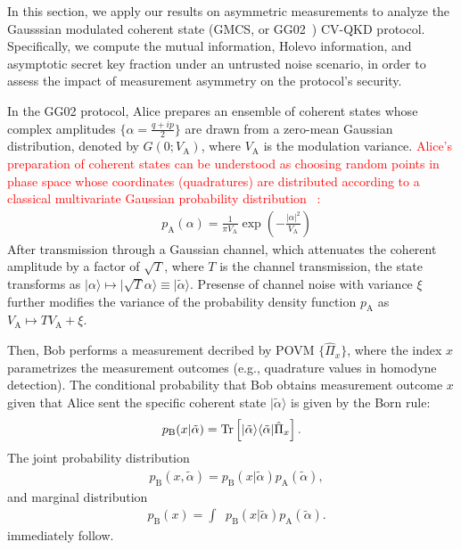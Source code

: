 \documentclass[%
reprint,
superscriptaddress,
 amsmath,amssymb,amsfonts,
 aps,
 pra,
 longbibliography
]{revtex4-2}
\newcommand{\ket}[1]{\ensuremath{|{#1}\rangle}}
\newcommand{\bra}[1]{\ensuremath{\langle{#1}|}}
\newcommand{\Tr}{\mathop{\rm Tr}\nolimits}
\newcommand{\ind}[1]{\mathrm{#1}}
\newcommand{\dd}{\mathrm{d}}
\begin{document}
In this section, we apply our results on asymmetric measurements to analyze the Gausssian modulated coherent state (GMCS, or GG02~\cite{PhysRevLett.88.057902}) CV-QKD protocol. Specifically, we compute the mutual information, Holevo information, and asymptotic secret key fraction under an untrusted noise scenario, in order to assess the impact of measurement asymmetry on the protocol’s security.

In the GG02 protocol, Alice prepares an ensemble of coherent states whose 
complex amplitudes $\{\alpha=\frac{q+ip}2\}$ are drawn from a zero-mean Gaussian distribution, denoted by $G(0; V_{\ind{A}})$, where $V_{\ind{A}}$ is the modulation variance. 
\textcolor{red}{Alice’s preparation of coherent states can be understood as choosing 
random points in phase space whose coordinates (quadratures) are 
distributed according to a classical multivariate Gaussian probability 
distribution {~\cite{Serafini:bk:2017}}:}
\begin{align}
  \label{eq:p_A}
  &p_{\ind{A}}(\alpha)=\frac{1}{\pi V_{\ind{A}}} \exp\left(-\frac{|\alpha|^2}{V_{\ind{A}}}\right)
\end{align}
After transmission through a Gaussian channel, which attenuates the coherent amplitude by a factor of $\sqrt{T}$, where $T$ is the channel transmission, the state transforms as $\ket{\alpha}\mapsto\ket{\sqrt{T}\alpha}\equiv\ket{\tilde\alpha}$. Presense of channel noise with variance $\xi$ further modifies the variance of the probability density function $p_{\ind{A}}$ as $V_{\ind{A}}\mapsto TV_{\ind{A}}+\xi$.

Then, Bob performs a measurement decribed by POVM $\{\hat{\Pi}_x\}$, where the index $x$ parametrizes the measurement outcomes (e.g., quadrature values in homodyne detection). The conditional probability that Bob obtains measurement outcome $x$ given that Alice sent the specific coherent state $\ket{\tilde\alpha}$ is given by the Born rule:
\begin{align}
\label{eq:pB(x|A)}
    p_{\ind{B}}(x|\tilde\alpha) = \Tr \left[ \ket{{\tilde\alpha}}\bra{{\tilde\alpha}}\hat{\Pi}_x \right].
\end{align}
The joint probability distribution
\begin{align}
\label{eq:pBxa}
    &p_{\ind{B}}(x,\tilde \alpha)=p_{\ind{B}}(x|\tilde \alpha)
    p_{\ind{A}}(\tilde \alpha),
\end{align}
and marginal distribution
\begin{align}
\label{eq:pBx}
    &p_{\ind{B}}(x)=\int \mathop{\dd^2\tilde \alpha} p_{\ind{B}}(x|\tilde \alpha)
    p_{\ind{A}}(\tilde \alpha).
\end{align}
immediately follow.
\end{document}
